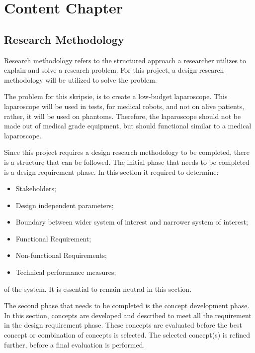 \chapter{Content Chapter}
\label{sec:Content Chapter}


\section{Research Methodology}
\label{sec:Research Methodology}

Research methodology refers to the structured approach a researcher utilizes to explain and solve a research problem. For this project, a design research methodology will be utilized to solve the problem. 

\vspace{0.5cm}
\noindent
The problem for this skripsie, is to create a low-budget laparoscope. This laparoscope will be used in tests, for medical robots, and not on alive patients, rather, it will be used on phantoms. Therefore, the laparoscope should not be made out of medical grade equipment, but should functional similar to a medical laparoscope. 

\vspace{0.5cm}
\noindent
Since this project requires a design research methodology to be completed, there is a structure that can be followed. The initial phase that needs to be completed is a design requirement phase. In this section it required to determine:

\begin{itemize}
    \item Stakeholders;
    \item Design independent parameters;
    \item Boundary between wider system of interest and narrower system of interest;
    \item Functional Requirement;
    \item Non-functional Requirements;
    \item Technical performance measures;
\end{itemize}

\noindent of the system. It is essential to remain neutral in this section.

\vspace{0.5cm}
\noindent
The second phase that needs to be completed is the concept development phase. In this section, concepts are developed and described to meet all the requirement in the design requirement phase. These concepts are evaluated before the best concept or combination of concepts is selected. The selected concept(s) is refined further, before a final evaluation is performed.

